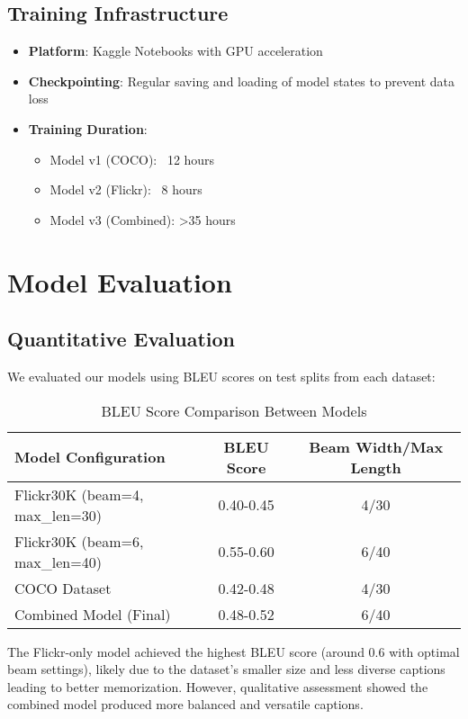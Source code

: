 \documentclass[12pt,a4paper]{report}
\begin{document}
\subsection{Training Infrastructure}
\begin{itemize}
    \item \textbf{Platform}: Kaggle Notebooks with GPU acceleration
    \item \textbf{Checkpointing}: Regular saving and loading of model states to prevent data loss
    \item \textbf{Training Duration}: 
        \begin{itemize}
            \item Model v1 (COCO): ~12 hours
            \item Model v2 (Flickr): ~8 hours
            \item Model v3 (Combined): >35 hours
        \end{itemize}
\end{itemize}

\section{Model Evaluation}
\subsection{Quantitative Evaluation}
We evaluated our models using BLEU scores on test splits from each dataset:

\begin{table}[h]
\centering
\begin{tabular}{lcc}
\toprule
\textbf{Model Configuration} & \textbf{BLEU Score} & \textbf{Beam Width/Max Length} \\
\midrule
Flickr30K (beam=4, max\_len=30) & 0.40-0.45 & 4/30 \\
Flickr30K (beam=6, max\_len=40) & 0.55-0.60 & 6/40 \\
COCO Dataset & 0.42-0.48 & 4/30 \\
Combined Model (Final) & 0.48-0.52 & 6/40 \\
\bottomrule
\end{tabular}
\caption{BLEU Score Comparison Between Models}
\label{tab:bleu_scores}
\end{table}

The Flickr-only model achieved the highest BLEU score (around 0.6 with optimal beam settings), likely due to the dataset's smaller size and less diverse captions leading to better memorization. However, qualitative assessment showed the combined model produced more balanced and versatile captions.
\end{document}
